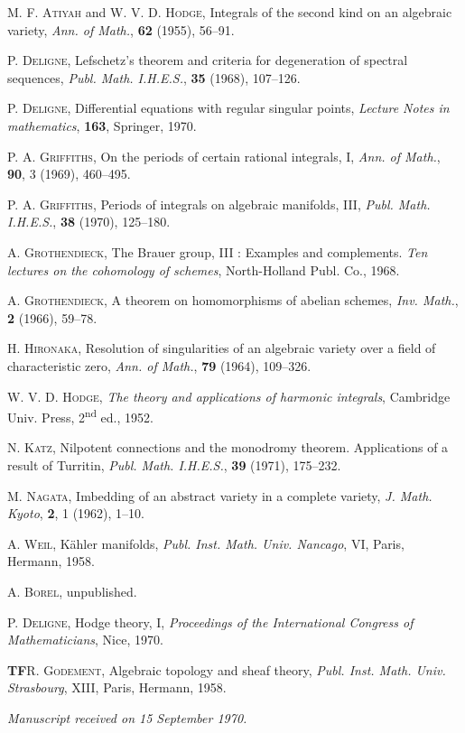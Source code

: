 \documentclass[10pt]{article}
\begin{document}
\begin{enumerate}[label={[\arabic*]},leftmargin=2.8em]
\item \textsc{M. F. Atiyah} and \textsc{W. V. D. Hodge}, Integrals of the second kind on an algebraic variety, \emph{Ann. of Math.}, \textbf{62} (1955), 56--91.
\item \textsc{P. Deligne}, Lefschetz's theorem and criteria for degeneration of spectral sequences, \emph{Publ. Math. I.H.E.S.}, \textbf{35} (1968), 107--126.
\item \textsc{P. Deligne}, Differential equations with regular singular points, \emph{Lecture Notes in mathematics}, \textbf{163}, Springer, 1970.
\item \textsc{P. A. Griffiths}, On the periods of certain rational integrals, I, \emph{Ann. of Math.}, \textbf{90}, 3 (1969), 460--495.
\item \textsc{P. A. Griffiths}, Periods of integrals on algebraic manifolds, III, \emph{Publ. Math. I.H.E.S.}, \textbf{38} (1970), 125--180.
\item \textsc{A. Grothendieck}, The Brauer group, III : Examples and complements. \emph{Ten lectures on the cohomology of schemes}, North-Holland Publ. Co., 1968.
\item \textsc{A. Grothendieck}, A theorem on homomorphisms of abelian schemes, \emph{Inv. Math.}, \textbf{2} (1966), 59--78.
\item \textsc{H. Hironaka}, Resolution of singularities of an algebraic variety over a field of characteristic zero, \emph{Ann. of Math.}, \textbf{79} (1964), 109--326.
\item \textsc{W. V. D. Hodge}, \emph{The theory and applications of harmonic integrals}, Cambridge Univ. Press, 2\textsuperscript{nd} ed., 1952.
\item \textsc{N. Katz}, Nilpotent connections and the monodromy theorem. Applications of a result of Turritin, \emph{Publ. Math. I.H.E.S.}, \textbf{39} (1971), 175--232.
\item \textsc{M. Nagata}, Imbedding of an abstract variety in a complete variety, \emph{J. Math. Kyoto}, \textbf{2}, 1 (1962), 1--10.
\item \textsc{A. Weil}, Kähler manifolds, \emph{Publ. Inst. Math. Univ. Nancago}, VI, Paris, Hermann, 1958.
\item \textsc{A. Borel}, unpublished.
\item \textsc{P. Deligne}, Hodge theory, I, \emph{Proceedings of the International Congress of Mathematicians}, Nice, 1970.
\end{enumerate}

\noindent\textbf{TF}\quad \textsc{R. Godement}, Algebraic topology and sheaf theory, \emph{Publ. Inst. Math. Univ. Strasbourg}, XIII, Paris, Hermann, 1958.

\begin{center}
\emph{Manuscript received on 15 September 1970.}
\end{center}

\end{document}
